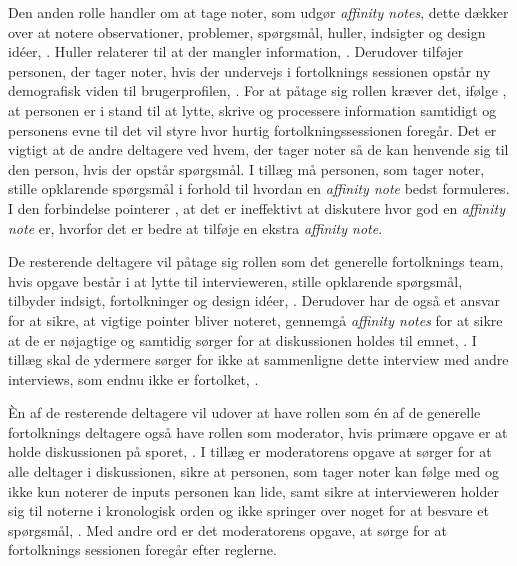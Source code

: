 Den anden rolle handler om at tage noter, som udgør \textit{affinity notes}, dette dækker over at notere observationer, problemer, spørgsmål, huller, indsigter og design idéer, \parencite[s. 107]{Book:CIInterpretationSession}. Huller relaterer til at der mangler information, \parencite[s. 162]{Book:BuildingAnAffinity}. Derudover tilføjer personen, der tager noter, hvis der undervejs i fortolknings sessionen opstår ny demografisk viden til brugerprofilen, \parencite[s. 107]{Book:CIInterpretationSession}. For at påtage sig rollen kræver det, ifølge \textcite[s. 107]{Book:CIInterpretationSession}, at personen er i stand til at lytte, skrive og processere information samtidigt og personens evne til det vil styre hvor hurtig fortolkningssessionen foregår. Det er vigtigt at de andre deltagere ved hvem, der tager noter så de kan henvende sig til den person, hvis der opstår spørgsmål. I tillæg må personen, som tager noter, stille opklarende spørgsmål i forhold til hvordan en \textit{affinity note} bedst formuleres. I den forbindelse pointerer \textcite[s. 108]{Book:CIInterpretationSession}, at det er ineffektivt at diskutere hvor god en \textit{affinity note} er, hvorfor det er bedre at tilføje en ekstra \textit{affinity note}. 

De resterende deltagere vil påtage sig rollen som det generelle fortolknings team, hvis opgave består i at lytte til intervieweren, stille opklarende spørgsmål, tilbyder indsigt, fortolkninger og design idéer, \parencite[s. 108]{Book:CIInterpretationSession}. Derudover har de også et ansvar for at sikre, at vigtige pointer bliver noteret, gennemgå \textit{affinity notes} for at sikre at de er nøjagtige og samtidig sørger for at diskussionen holdes til emnet, \parencite[s. 108]{Book:CIInterpretationSession}. I tillæg skal de ydermere sørger for ikke at sammenligne dette interview med andre interviews, som endnu ikke er fortolket, \parencite[s. 108]{Book:CIInterpretationSession}. 

Èn af de resterende deltagere vil udover at have rollen som én af de generelle fortolknings deltagere også have rollen som moderator, hvis primære opgave er at holde diskussionen på sporet, \parencite[s. 108]{Book:CIInterpretationSession}. I tillæg er moderatorens opgave at sørger for at alle deltager i diskussionen, sikre at personen, som tager noter kan følge med og ikke kun noterer de inputs personen kan lide, samt sikre at intervieweren holder sig til noterne i kronologisk orden og ikke springer over noget for at besvare et spørgsmål, \parencite[ss. 108-109]{Book:CIInterpretationSession}. Med andre ord er det moderatorens opgave, at sørge for at fortolknings sessionen foregår efter reglerne. 

